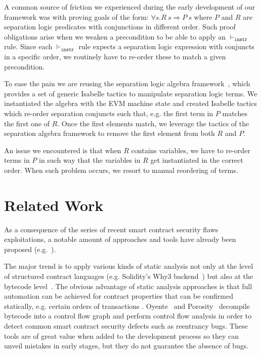 \documentclass[sigplan,10pt,review]{acmart}\settopmatter{printfolios=true,printccs=false,printacmref=false}
\begin{document}
A common source of friction we experienced during the early development
of our framework was with proving goals of the form:
$\forall s. R~s \Longrightarrow P~s$ where $P$ and $R$ are separation logic predicates
with conjunctions in different order.
Such proof obligations arise when we weaken a precondition to be
able to apply an $\vdash_\mathtt{instr}$ rule.
Since each $\vdash_\mathtt{instr}$ rule expects a separation logic expression with conjuncts
in a specific order, we routinely have to re-order these to
match a given precondition.

To ease the pain we are reusing the separation logic algebra framework~\cite{Klein_KB_12},
which provides a set of generic Isabelle tactics to manipulate separation logic terms.
We instantiated the algebra with the EVM machine state and created Isabelle tactics
which re-order separation conjuncts such that, e.g. %
the first term in $P$ matches the first one of $R$.
Once the first elements match, we leverage the tactics of the separation
algebra framework to remove the first element from both $R$ and $P$.

An issue we encountered is that when $R$ contains variables,
we have to re-order terms in $P$ in such way that the variables in $R$ get instantiated
in the correct order.
When such problem occurs, we resort to manual reordering of terms. %

\section{Related Work}
\label{sec:rwork}
%
As a consequence of the series of recent smart contract security flaws exploitations,
a notable amount of approaches and tools have already been proposed (e.g.~\cite{Bhargavan:2016:FVS:2993600.2993611,securify,Luu_COSH_16}).
 
The major trend is to apply various kinds of static analysis not only at the level of structured contract
languages (e.g. Solidity's Why3 backend~\cite{filliatre2013why3,Reitwiessner_16}) but also at the bytecode level~\cite{Msuiche_17,securify,Luu_COSH_16}. 
%
The obvious advantage of static analysis approaches is that full automation can be achieved for 
contract properties that can be confirmed statically, e.g. certain orders of transactions \cite{securify}.
Oyente~\cite{Luu_COSH_16} and Porosity~\cite{Msuiche_17} decompile
bytecode into a control flow graph and perform control flow analysis in order
to detect common smart contract security defects such as reentrancy bugs.
These tools are of great value when added to the development process so
they can unveil mistakes in early stages, but they do not guarantee the absence of bugs.
\end{document}
